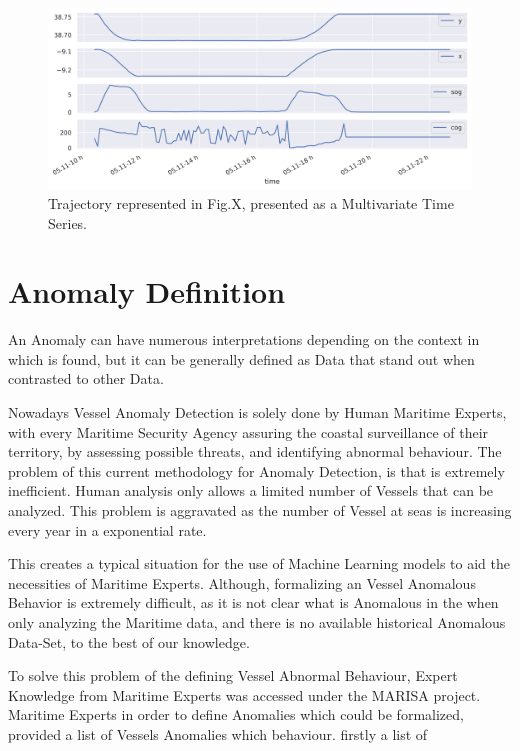 \begin{figure}[H]
	\centering
	\includegraphics[scale = .5]{figures/Ch3/ts_example.png}
    \caption{Trajectory represented in Fig.X, presented as a Multivariate Time Series.}
    \label{fig: MTimeSeries_example}
\end{figure}


\section{Anomaly Definition}
An Anomaly can have numerous interpretations depending on the context in which is found, but it can be generally defined as Data that stand out when contrasted to other Data.

Nowadays Vessel Anomaly Detection is solely done by Human Maritime Experts, with every Maritime Security Agency assuring the coastal surveillance of their territory, by assessing possible threats, and identifying abnormal behaviour. 
The problem of this current methodology for Anomaly Detection, is that is extremely inefficient. Human analysis only allows a limited number of Vessels that can be analyzed. This problem is aggravated as the number of Vessel at seas is increasing every year in a exponential rate. 

This creates a typical situation for the use of Machine Learning models to aid the necessities of Maritime Experts.
Although, formalizing an Vessel Anomalous Behavior is extremely difficult, as it is not clear what is Anomalous in the when only analyzing the Maritime data, and there is no available historical Anomalous Data-Set, to the best of our knowledge.

To solve this problem of the defining Vessel Abnormal Behaviour, Expert Knowledge from Maritime Experts was accessed under the MARISA project. Maritime Experts in order to define Anomalies which could be formalized, provided a list of Vessels Anomalies which behaviour. firstly a list of  



